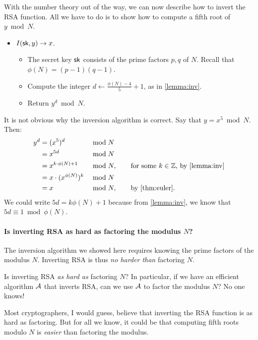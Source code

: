 With the number theory out of the way, we can now describe how
to invert the RSA function.
All we have to do is to show how to compute a fifth root of $y \bmod N$.

\begin{itemize}
  \item $I({\mathsf{sk}}, y) \to x$.
\begin{itemize}
  \item The secret key ${\mathsf{sk}}$ consists of the prime factors $p,q$ of $N$.
        Recall that $\phi(N) = (p-1)(q-1)$.
  \item Compute the integer $d \gets \frac{\phi(N) - 4}{5} + 1$, as in
    \cref{lemma:inv}.

  \item Return $y^d \bmod N$.
\end{itemize}
\end{itemize}

It is not obvious why the inversion algorithm is correct.
Say that $y = x^5 \bmod N$.
Then:
\begin{align*}
  y^d &= (x^5)^d &&\bmod N\\
      &= x^{5d} &&\bmod N\\
&= x^{k \cdot \phi(N) + 1} &&\bmod N, \qquad \text{for some $k \in \Z$, by \cref{lemma:inv}}\\
        &= x \cdot (x^{\phi(N)})^k &&\bmod N\\
&= x &&\bmod N, \qquad\text{by \cref{thm:euler}}.\\
\end{align*}
We could write $5d = k \phi(N) + 1$ because from \cref{lemma:inv},
we know that $5d \equiv 1 \bmod \phi(N)$.


\paragraph{Is inverting RSA as hard as factoring the modulus $N$?}
The inversion algorithm we showed here requires knowing the prime factors
of the modulus $N$.
Inverting RSA is thus \emph{no harder than} factoring $N$.

Is inverting RSA \emph{as hard as} factoring $N$?
In particular, if we have an efficient algorithm $\mathcal{A}$ that inverts
RSA, can we use $\mathcal{A}$ to factor the modulus $N$?
No one knows!

Most cryptographers, I would guess, believe that inverting the RSA function
is as hard as factoring.
But for all we know, it could be that computing fifth roots modulo $N$ is \emph{easier}
than factoring the modulus.


